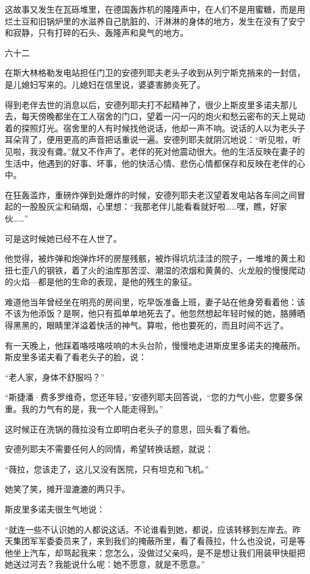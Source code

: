 这故事又发生在瓦砾堆里，在德国轰炸机的隆隆声中，在人们不是用蜜糖，而是用烂土豆和旧锅炉里的水滋养自己肮脏的、汗淋淋的身体的地方，发生在没有了安宁和寂静，只有打碎的石头、轰隆声和臭气的地方。

六十二

在斯大林格勒发电站担任门卫的安德列耶夫老头子收到从列宁斯克捎来的一封信，是儿媳妇写来的。儿媳妇在信里说，婆婆害肺炎死了。

得到老伴去世的消息以后，安德列耶夫打不起精神了，很少上斯皮里多诺夫那儿去，每天傍晚都坐在工人宿舍的门口，望着一闪一闪的炮火和愁云密布的天上晃动着的探照灯光。宿舍里的人有时候找他说话，他却一声不响。说话的人以为老头子耳朵背了，便用更高的声音把话重说一遍。安德列耶夫就阴沉地说：“听见啦，听见啦，我没有聋。”就又不作声了。老伴的死对他震动很大。他的生活反映在妻子的生活中，他遇到的好事、坏事，他的快活心情、悲伤心情都保存和反映在老伴的心中。

在狂轰滥炸，重磅炸弹到处爆炸的时候，安德列耶夫老汉望着发电站各车间之间冒起的一股股灰尘和硝烟，心里想：“我那老伴儿能看看就好啦……嘿，瞧，好家伙……”

可是这时候她已经不在人世了。

他觉得，被炸弹和炮弹炸坏的房屋残骸，被炸得坑坑洼洼的院子，一堆堆的黄土和扭七歪八的钢铁，着了火的油库那苦涩、潮湿的浓烟和黄黄的、火龙般的慢慢爬动的火焰—都是他的生命的表现，是他的残生的象征。

难道他当年曾经坐在明亮的房间里，吃早饭准备上班，妻子站在他身旁看着他：该不该为他添饭？是啊，他只有孤单单地死去了。他忽然想起年轻时候的她，胳膊晒得黑黑的，眼睛里洋溢着快活的神气。算啦，他也要死的，而且时间不远了。

有一天晚上，他踩着咯吱咯吱响的木头台阶，慢慢地走进斯皮里多诺夫的掩蔽所。斯皮里多诺夫看了看老头子的脸，说：

“老人家，身体不舒服吗？”

“斯捷潘·费多罗维奇，您还年轻，”安德列耶夫回答说，“您的力气小些，您要多保重。我的力气有的是，我一个人能走得到。”

这时候正在洗锅的薇拉没有立即明白老头子的意思，回头看了看他。

安德列耶夫不需要任何人的同情，希望转换话题，就说：

“薇拉，您该走了，这儿又没有医院，只有坦克和飞机。”

她笑了笑，摊开湿漉漉的两只手。

斯皮里多诺夫很生气地说：

“就连一些不认识她的人都说这话。不论谁看到她，都说，应该转移到左岸去。昨天集团军军委委员来了，来到我们的掩蔽所里，看了看薇拉，什么也没说，可是等他坐上汽车，却骂起我来：您怎么，没做过父亲吗，是不是想让我们用装甲快艇把她送过河去？我能说什么呢：她不愿意，就是不愿意。”

